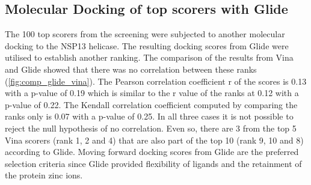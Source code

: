 \documentclass[11pt, letterpaper, titlepage]{article}
\begin{document}
\subsection{Molecular Docking of top scorers with Glide}
The 100 top scorers from the screening were subjected to another molecular docking to the NSP13 helicase. The resulting docking scores from Glide were utilised to establish another ranking. The comparison of the results from Vina and Glide showed that there was no correlation between these ranks (\autoref{fig:comp_glide_vina}). The Pearson correlation coefficient r of the scores is 0.13 with a p-value of 0.19 which is similar to the r value of the ranks at 0.12 with a p-value of 0.22. The Kendall correlation coefficient computed by comparing the ranks only is 0.07 with a p-value of 0.25. In all three cases it is not possible to reject the null hypothesis of no correlation. Even so, there are 3 from the top 5 Vina scorers (rank 1, 2 and 4) that are also part of the top 10 (rank 9, 10 and 8) according to Glide. Moving forward docking scores from Glide are the preferred selection criteria since Glide provided flexibility of ligands and the retainment of the protein zinc ions. \\
\end{document}

